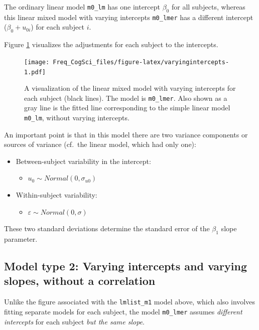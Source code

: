 \documentclass[
  12pt,
]{krantz}
\providecommand{\tightlist}{%
  \setlength{\itemsep}{0pt}\setlength{\parskip}{0pt}}
\theoremstyle{definition}
\theoremstyle{definition}
\theoremstyle{definition}
\theoremstyle{definition}
\theoremstyle{remark}
\begin{document}
The ordinary linear model \texttt{m0\_lm} has one intercept \(\beta_0\) for all subjects, whereas this linear mixed model with varying intercepts \texttt{m0\_lmer} has a different intercept (\(\beta_0 + u_{0i}\)) for each subject \(i\).

Figure \ref{fig:varyingintercepts} visualizes the adjustments for each subject to the intercepts.

\begin{figure}
\centering
\texttt{[image: Freq\_CogSci\_files/figure-latex/varyingintercepts-1.pdf]}
\caption{\label{fig:varyingintercepts}A visualization of the linear mixed model with varying intercepts for each subject (black lines). The model is \texttt{m0\_lmer}. Also shown as a gray line is the fitted line corresponding to the simple linear model \texttt{m0\_lm}, without varying intercepts.}
\end{figure}

An important point is that in this model there are two variance components or sources of variance (cf.~the linear model, which had only one):

\begin{itemize}
\tightlist
\item
  Between-subject variability in the intercept:

  \begin{itemize}
  \tightlist
  \item
    \(u_0 \sim Normal(0,\sigma_{u0})\)
  \end{itemize}
\item
  Within-subject variability:

  \begin{itemize}
  \tightlist
  \item
    \(\varepsilon \sim Normal(0,\sigma)\)
  \end{itemize}
\end{itemize}

These two standard deviations determine the standard error of the \(\beta_1\) slope parameter.

\hypertarget{model-type-2-varying-intercepts-and-varying-slopes-without-a-correlation}{%
\subsection{Model type 2: Varying intercepts and varying slopes, without a correlation}\label{model-type-2-varying-intercepts-and-varying-slopes-without-a-correlation}}

Unlike the figure associated with the \texttt{lmlist\_m1} model above, which also involves fitting separate models for each subject, the model \texttt{m0\_lmer} assumes \emph{different intercepts} for each subject \emph{but the same slope}.
\end{document}
